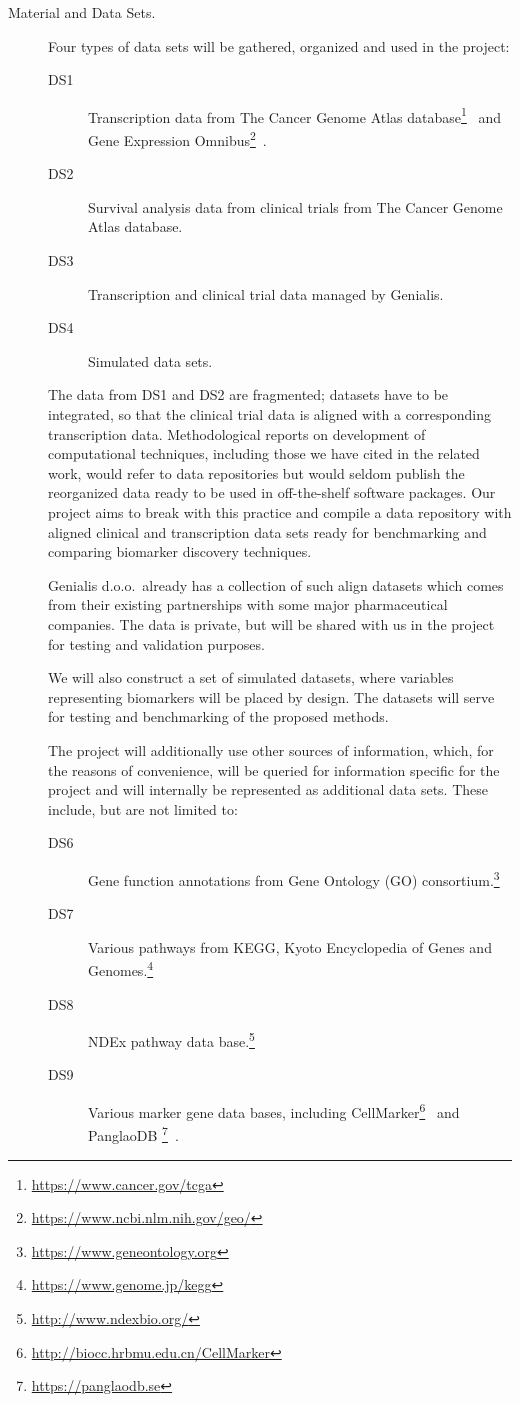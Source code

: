 \documentclass[11pt,a4paper]{article}
\newcommand{\myurl}[1]{\footnote{\url{#1}}}
\begin{document}
\begin{description}
	\item[Material and Data Sets.] Four types of data sets will be gathered, organized and used in the project:
	\begin{description}
		\item[DS1] Transcription data from The Cancer Genome Atlas database\myurl{https://www.cancer.gov/tcga}~\cite{24071849} and Gene Expression Omnibus\myurl{https://www.ncbi.nlm.nih.gov/geo/}~\cite{23193258}.
		\item[DS2] Survival analysis data from clinical trials from The Cancer Genome Atlas database.
		\item[DS3] Transcription and clinical trial data managed by Genialis.
		\item[DS4] Simulated data sets.
	\end{description}
	The data from DS1 and DS2 are fragmented; datasets have to be integrated, so that the clinical trial data is aligned with a corresponding transcription data. Methodological reports on development of computational techniques, including those we have cited in the related work, would refer to data repositories but would seldom publish the reorganized data ready to be used in off-the-shelf software packages. Our project aims to break with this practice and compile a data repository with aligned clinical and transcription data sets ready for benchmarking and comparing biomarker discovery techniques.
	
	Genialis d.o.o.~already has a collection of such align datasets which comes from their existing partnerships with some major pharmaceutical companies. The data is private, but will be shared with us in the project for testing and validation purposes.

	We will also construct a set of simulated datasets, where variables representing biomarkers will be placed by design. The datasets will serve for testing and benchmarking of the proposed methods.

	The project will additionally use other sources of information, which, for the reasons of convenience, will be queried for information specific for the project and will internally be represented as additional data sets. These include, but are not limited to:

	\begin{description}
		\item[DS6] Gene function annotations from Gene Ontology (GO) consortium.\myurl{https://www.geneontology.org}
		\item[DS7] Various pathways from KEGG, Kyoto Encyclopedia of Genes and Genomes.\myurl{https://www.genome.jp/kegg}
		\item[DS8] NDEx pathway data base.\myurl{http://www.ndexbio.org/}
		\item[DS9] Various marker gene data bases, including CellMarker\myurl{http://biocc.hrbmu.edu.cn/CellMarker}~\cite{cellmarker} and PanglaoDB
		\myurl{https://panglaodb.se}~\cite{30951143}.
	\end{description}


\end{description}
\end{document}
